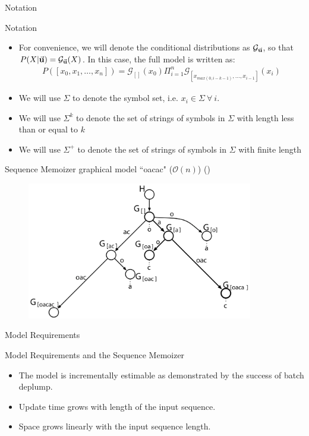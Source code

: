 \documentclass{beamer}
\newcommand{\G}{\mathcal{G}}
\newcommand{\bu}{{\bf u}}
\begin{document}
\begin{frame}[t]{Notation}
	\begin{block}{Notation}
		\begin{itemize}
			\item {For convenience, we will denote the conditional distributions as $\G_{\vec \bu}$, so that $P(X | \vec \bu) =  \G_{\vec \bu}(X)$.  In this case, the full model is written as:
						\begin{eqnarray*}
							P([x_0, x_1, \ldots, x_n]) = \G_{[]}(x_0) \Pi_{i = 1}^n \G_{[x_{max(0, i-k-1)}, \ldots, x_{i-1}]}(x_i)  
						\end{eqnarray*}
			}
		 	\item We will use $\Sigma$ to denote the symbol set, i.e. $x_i \in \Sigma \ \forall \ i$.
			\item We will use $\Sigma^k$ to denote the set of strings of symbols in $\Sigma$ with length less than or equal to $k$
			\item We will use $\Sigma^+$ to denote the set of strings of symbols in $\Sigma$ with finite length
		\end{itemize}
	\end{block}
	
\end{frame}
\begin{frame}[t]{Sequence Memoizer graphical model ``oacac" ($\mathcal{O}(n)$) (\citet{Wood2009})}
	\begin{figure}[t]
		\begin{center}
			\includegraphics[height = 6cm]{../figs/prefix_tree_not_coloured.pdf}
		\end{center}
	\end{figure}
\end{frame}

\begin{frame}[t]{Model Requirements}
	\begin{block}{Model Requirements and the Sequence Memoizer}
		\begin{itemize}
			\item The model is incrementally estimable as demonstrated by the success of batch deplump.
			\item Update time grows with length of the input sequence.
			\item Space grows linearly with the input sequence length.
		\end{itemize}
	\end{block}
\end{frame}
\end{document}
